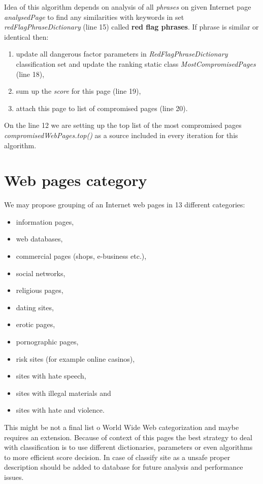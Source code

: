 \documentclass[9pt,a4paper]{extarticle}
\begin{document}
\begin{multicols}{2}
Idea of this algorithm depends on analysis of all \textit{phrases} on given Internet page \textit{analysedPage} to find any similarities 
with keywords in set \textit{redFlagPhraseDictionary} (line 15) called \textbf{red flag phrases}. If phrase is similar or identical then:
\begin{enumerate}
\item update all dangerous factor parameters in \textit{RedFlagPhraseDictionary} classification set and update the ranking static class \textit{MostCompromisedPages} (line 18),
\item sum up the \textit{score} for this page (line 19),
\item attach this page to list of compromised pages (line 20).
\end{enumerate}
On the line 12 we are setting up the top list of the most compromised pages \textit{compromisedWebPages.top()} as a source included in every iteration for this algorithm.

\section{Web pages category}
We may propose grouping of an Internet web pages in 13 different categories:
\begin{itemize}
\item information pages,
\item web databases,
\item commercial pages (shops, e-business etc.),
\item social networks,
\item religious pages,
\item dating sites,
\item erotic pages,
\item pornographic pages,
\item risk sites (for example online casinos),
\item sites with hate speech,
\item sites with illegal materials and
\item sites with hate and violence.
\end{itemize}
This might be not a final list o World Wide Web categorization and maybe requires an extension. Because of context of this pages the best strategy to deal with classification is to use different dictionaries, parameters or even algorithms to more efficient score decision. In case of classify site as a unsafe proper description should be added to database for future analysis and performance issues.


\end{multicols}
\end{document}
